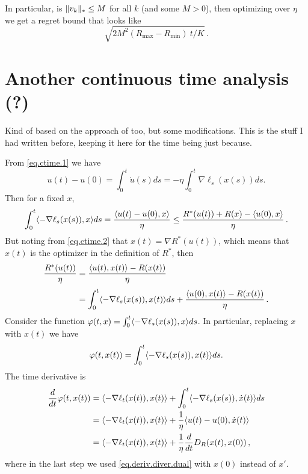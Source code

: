 \documentclass[12pt]{article}
\theoremstyle{plain}
\theoremstyle{definition}
\theoremstyle{remark}
\begin{document}
In particular, is $\lVert v_{k} \rVert_{*} \leq M$ for all $k$ (and some $M > 0$),
then optimizing over $\eta$ we get a regret bound that looks like
$$
\sqrt{2M^2(R_{\text{max}} - R_{\text{min}}) \ t/K}\,.
$$


\medskip


\section*{Another continuous time analysis (?)}

Kind of based on the approach of \cite{Kwon-M} too, but some modifications.
This is the stuff I had written before, keeping it here for the time being just because.

\bigskip

\noindent
From \eqref{eq.ctime.1} we have
$$
u(t) - u(0) = \int_{0}^{t} \dot{u}(s) ds = -\eta \int_{0}^{t} \nabla\ell_{s}(x(s)) ds.
$$
Then for a fixed $x$,
\begin{equation}
\int_{0}^{t} \langle {-\nabla\ell_{s}(x(s)), x}\rangle ds
= \frac{\langle {u(t) - u(0), x}\rangle}{\eta}
\leq \frac{R^{*}(u(t)) + R(x) - \langle {u(0),x}\rangle}{\eta}\,.
\label{eq.using.fenchel.ineq}
\end{equation}
But noting from \eqref{eq.ctime.2} that $x(t) = \nabla R^{*}(u(t))$, 
which means that $x(t)$ is the optimizer in the definition of $R^{*}$, 
then
\begin{align}
\frac{R^{*}(u(t))}{\eta}
&= \frac{\langle {u(t), x(t)}\rangle - R(x(t))}{\eta} \notag \\[1mm]
&= \int_{0}^{t} \langle {-\nabla\ell_{s}(x(s)), x(t)}\rangle ds + \frac{\langle {u(0),x(t)}\rangle-R(x(t))}{\eta}\,.
\label{eq.something}
\end{align}
Consider the function $\varphi(t,x) = \int_{0}^{t} \langle {-\nabla\ell_{s}(x(s)), x}\rangle ds$.
In particular, replacing $x$ with $x(t)$ we have
$$
\varphi(t,x(t)) = \int_{0}^{t} \langle {-\nabla\ell_{s}(x(s)), x(t)}\rangle ds.
$$
The time derivative is
\begin{align*}
\frac{d}{dt}\varphi(t,x(t))
&= \langle {-\nabla\ell_{t}(x(t)), x(t)}\rangle + \int_{0}^{t} \langle {-\nabla\ell_{s}(x(s)), \dot{x}(t)}\rangle ds \\
&= \langle {-\nabla\ell_{t}(x(t)), x(t)}\rangle + \frac{1}{\eta} \langle {u(t) - u(0), \dot{x}(t)}\rangle \\
&= \langle {-\nabla\ell_{t}(x(t)), x(t)}\rangle + \frac{1}{\eta} \frac{d}{dt} D_{R}(x(t), x(0)) \,,
\end{align*}
where in the last step we used \eqref{eq.deriv.diver.dual} with $x(0)$ instead of $x'$.
\end{document}
